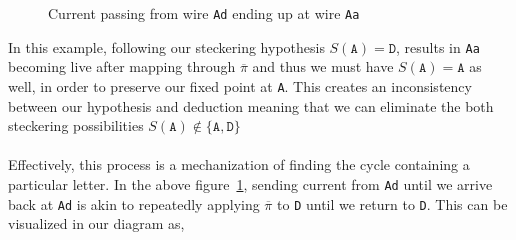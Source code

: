 \begin{figure}[H]
\begin{minipage}{0.45\textwidth}
  \end{minipage}
  \caption{Current passing from wire \texttt{Ad} ending up at wire \texttt{Aa}}
  \label{fig:incorrect_stecker}
\end{figure}
\noindent In this example, following our steckering hypothesis
$S(\texttt{A}) = \texttt{D}$,
results in \texttt{Aa} becoming live after mapping through $\overline\pi$ and
thus we must have $S(\texttt{A}) = \texttt{A}$ as well, in order to preserve our fixed point at \texttt{A}.
This creates an inconsistency between our hypothesis and deduction
meaning that we can eliminate the both
steckering possibilities $S(\texttt{A}) \notin \{\texttt{A},
\texttt{D}\}$
\\\\Effectively, this process is a mechanization of
finding the cycle containing a particular letter. In the above
figure~\ref{fig:incorrect_stecker}, sending current from \texttt{Ad}
until we arrive back at \texttt{Ad} is
akin to repeatedly applying $\overline\pi$ to \texttt{D}
until we return to \texttt{D}. This can be visualized in our diagram as,

